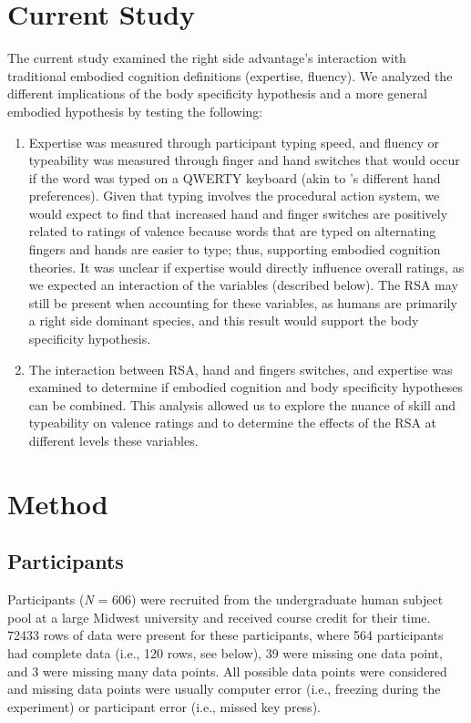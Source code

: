 \documentclass[english,man,man,mask]{apa6}
\providecommand{\tightlist}{%
  \setlength{\itemsep}{0pt}\setlength{\parskip}{0pt}}
\theoremstyle{definition}
\theoremstyle{definition}
\theoremstyle{definition}
\theoremstyle{remark}
\begin{document}
\section{Current Study}\label{current-study}

The current study examined the right side advantage's interaction with
traditional embodied cognition definitions (expertise, fluency). We
analyzed the different implications of the body specificity hypothesis
and a more general embodied hypothesis by testing the following:

\begin{enumerate}
\def\labelenumi{\arabic{enumi})}
\tightlist
\item
  Expertise was measured through participant typing speed, and fluency
  or typeability was measured through finger and hand switches that
  would occur if the word was typed on a QWERTY keyboard (akin to
  \textcite{Beilock2007}'s different hand preferences). Given that
  typing involves the procedural action system, we would expect to find
  that increased hand and finger switches are positively related to
  ratings of valence because words that are typed on alternating fingers
  and hands are easier to type; thus, supporting embodied cognition
  theories. It was unclear if expertise would directly influence overall
  ratings, as we expected an interaction of the variables (described
  below). The RSA may still be present when accounting for these
  variables, as humans are primarily a right side dominant species, and
  this result would support the body specificity hypothesis.
\item
  The interaction between RSA, hand and fingers switches, and expertise
  was examined to determine if embodied cognition and body specificity
  hypotheses can be combined. This analysis allowed us to explore the
  nuance of skill and typeability on valence ratings and to determine
  the effects of the RSA at different levels these variables.
\end{enumerate}

\section{Method}\label{method}

\subsection{Participants}\label{participants}

Participants (\emph{N} = 606) were recruited from the undergraduate
human subject pool at a large Midwest university and received course
credit for their time. 72433 rows of data were present for these
participants, where 564 participants had complete data (i.e., 120 rows,
see below), 39 were missing one data point, and 3 were missing many data
points. All possible data points were considered and missing data points
were usually computer error (i.e., freezing during the experiment) or
participant error (i.e., missed key press).
\end{document}
